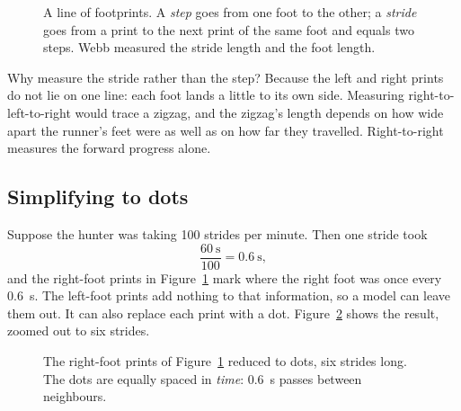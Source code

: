 \documentclass[11pt,twoside,openany]{book}
\newcommand{\footprint}[3]{%
  \begin{scope}[shift={(#1,#2)},rotate=#3]
    \fill[slate!70] (0,0) ellipse (0.13 and 0.32);
    \fill[slate!70] (0.02,0.42) ellipse (0.07 and 0.09);
    \fill[slate!70] (-0.07,0.44) ellipse (0.045 and 0.06);
    \fill[slate!70] (-0.13,0.42) ellipse (0.035 and 0.05);
  \end{scope}}
\begin{document}
\begin{figure}[htb]
\centering
{}
\caption{A line of footprints. A \emph{step} goes from one foot to the other; a \emph{stride} goes from a print to the next print of the same foot and equals two steps. Webb measured the stride length and the foot length.}
\label{fig:footprints}
\end{figure}

Why measure the stride rather than the step? Because the left and right prints do not lie on one line: each foot lands a little to its own side. Measuring right-to-left-to-right would trace a zigzag, and the zigzag's length depends on how wide apart the runner's feet were as well as on how far they travelled. Right-to-right measures the forward progress alone.

\subsection{Simplifying to dots}

Suppose the hunter was taking \num{100} strides per minute. Then one stride took
\[
\frac{\SI{60}{\second}}{100} = \SI{0.6}{\second},
\]
and the right-foot prints in Figure~\ref{fig:footprints} mark where the right foot was once every \SI{0.6}{\second}. The left-foot prints add nothing to that information, so a model can leave them out. It can also replace each print with a dot. Figure~\ref{fig:dots} shows the result, zoomed out to six strides.

\begin{figure}[htb]
\centering
{}
\caption{The right-foot prints of Figure~\ref{fig:footprints} reduced to dots, six strides long. The dots are equally spaced in \emph{time}: \SI{0.6}{\second} passes between neighbours.}
\label{fig:dots}
\end{figure}
\end{document}
